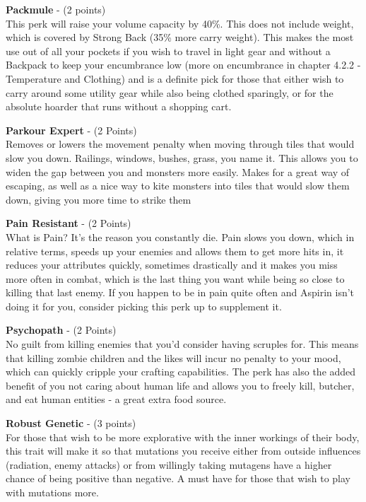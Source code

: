 \textbf{Packmule} - (2 points)\\This perk will raise your volume capacity by 40\%. This does not include weight, which is covered by Strong Back (35\% more carry weight). This makes the most use out of all your pockets if you wish to travel in light gear and without a Backpack to keep your encumbrance low (more on encumbrance in chapter 4.2.2 - Temperature and Clothing) and is a definite pick for those that either wish to carry around some utility gear while also being clothed sparingly, or for the absolute hoarder that runs without a shopping cart.

\textbf{Parkour Expert} - (2 Points)\\Removes or lowers the movement penalty when moving through tiles that would slow you down. Railings, windows, bushes, grass, you name it. This allows you to widen the gap between you and monsters more easily. Makes for a great way of escaping, as well as a nice way to kite monsters into tiles that would slow them down, giving you more time to strike them

\textbf{Pain Resistant} - (2 Points)\\What is Pain? It's the reason you constantly die. Pain slows you down, which in relative terms, speeds up your enemies and allows them to get more hits in, it reduces your attributes quickly, sometimes drastically and it makes you miss more often in combat, which is the last thing you want while being so close to killing that last enemy. If you happen to be in pain quite often and Aspirin isn't doing it for you, consider picking this perk up to supplement it.

\textbf{Psychopath} - (2 Points)\\No guilt from killing enemies that you'd consider having scruples for. This means that killing zombie children and the likes will incur no penalty to your mood, which can quickly cripple your crafting capabilities. The perk has also the added benefit of you not caring about human life and allows you to freely kill, butcher, and eat human entities - a great extra food source.

\textbf{Robust Genetic} - (3 points)\\For those that wish to be more explorative with the inner workings of their body, this trait will make it so that mutations you receive either from outside influences (radiation, enemy attacks) or from willingly taking mutagens have a higher chance of being positive than negative. A must have for those that wish to play with mutations more.

